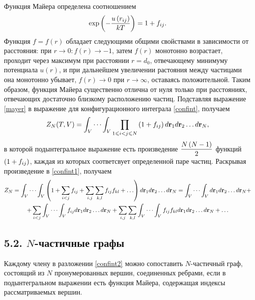 Функция Майера определена соотношением
\vverh
\begin{gather}
	\exp \left( - \frac{u \left( r_{ij} \right)}{kT} \right) = 1 + f_{ij} . \label{mayer}
\end{gather}
Функция $f = f(r)$ обладает следующими общими свойствами в зависимости от расстояния: при $r \longrightarrow 0: f(r) \longrightarrow -1$, затем $f(r)$ монотонно возрастает, проходит через максимум при расстоянии $r = d_0$, отвечающему минимуму потенциала $u(r)$, и при дальнейшем увеличении растояния между частицами она монотонно убывает, $f(r) \longrightarrow 0$ при $r \longrightarrow \infty$, оставаясь положительной. Таким образом, функция Майера существенно отлична от нуля только при расстояниях, отвечающих достаточно близкому расположению частиц. Подставляя выражение \eqref{mayer} в выражение для конфигурационного интеграла \eqref{confint}, получаем
\vverh
\begin{gather}
	Z_N (T, V) = \int_V \cdots \int_V \prod_{1 \leqslant i < j \leqslant N} \left( 1 + f_{ij} \right) d \mathbf{r}_1 d \mathbf{r}_2 \dots d \mathbf{r}_N , \label{confint1}
\end{gather}
в которой подынтегральное выражение есть произведение $\displaystyle\frac{N \left( N - 1 \right)}{2}$ функций $\left( 1 + f_{ij} \right)$, каждая из которых соответсвует определенной паре частиц. Раскрывая произведение в \eqref{confint1}, получаем
\vverh
\begin{gather}
	Z_N = \int_V \cdots \int_V \lb 1 + \sum_{i < j} f_{ij} + \sum_{i, j} \sum_{k,l} f_{ij} f_{kl} + \dots \rb d \mathbf{r}_1 d \mathbf{r}_2 \dots d \mathbf{r}_N = \int_V \cdots \int_V d \mathbf{r}_1 d \mathbf{r}_2 \dots d \mathbf{r}_N + \notag \\ 
	+ \sum_{i < j} \int_V \cdots \int_V f_{ij} d \mathbf{r}_1 d \mathbf{r}_2 \dots d \mathbf{r}_N + \sum_{i, j} \sum_{k, l} \int_V \cdots \int_V f_{ij} f_{kl} d \mathbf{r}_1 d \mathbf{r}_2 \dots d \mathbf{r}_N + \dots \label{confint2}  
\end{gather}

\subsection*{\textbf{5.2.} $N$-частичные графы \cite{mayer}}

Каждому члену в разложении \eqref{confint2} можно сопоставить $N$-частичный граф, состоящий из $N$ пронумерованных вершин, соединенных ребрами, если в подынтегральном выражении есть функция Майера, содержащая индексы рассматриваемых вершин.

